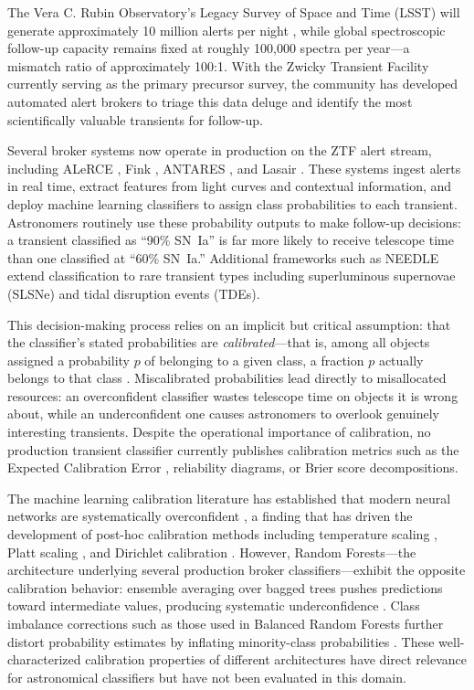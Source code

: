 \documentclass[twocolumn]{aastex631}
\begin{document}
The Vera C. Rubin Observatory's Legacy Survey of Space and Time (LSST) will generate approximately 10 million alerts per night \citep{ivezic2019}, while global spectroscopic follow-up capacity remains fixed at roughly 100,000 spectra per year---a mismatch ratio of approximately 100:1. With the Zwicky Transient Facility \citep[ZTF;][]{bellm2019} currently serving as the primary precursor survey, the community has developed automated alert brokers to triage this data deluge and identify the most scientifically valuable transients for follow-up.

Several broker systems now operate in production on the ZTF alert stream, including ALeRCE \citep{forster2021}, Fink \citep{moller2021}, ANTARES \citep{narayan2018}, and Lasair \citep{smith2019}. These systems ingest alerts in real time, extract features from light curves and contextual information, and deploy machine learning classifiers to assign class probabilities to each transient. Astronomers routinely use these probability outputs to make follow-up decisions: a transient classified as ``90\% SN~Ia'' is far more likely to receive telescope time than one classified at ``60\% SN~Ia.'' Additional frameworks such as NEEDLE \citep{sheng2024} extend classification to rare transient types including superluminous supernovae (SLSNe) and tidal disruption events (TDEs).

This decision-making process relies on an implicit but critical assumption: that the classifier's stated probabilities are \emph{calibrated}---that is, among all objects assigned a probability $p$ of belonging to a given class, a fraction $p$ actually belongs to that class \citep{dawid1982}. Miscalibrated probabilities lead directly to misallocated resources: an overconfident classifier wastes telescope time on objects it is wrong about, while an underconfident one causes astronomers to overlook genuinely interesting transients. Despite the operational importance of calibration, no production transient classifier currently publishes calibration metrics such as the Expected Calibration Error \citep[ECE;][]{naeini2015}, reliability diagrams, or Brier score decompositions.

The machine learning calibration literature has established that modern neural networks are systematically overconfident \citep{guo2017}, a finding that has driven the development of post-hoc calibration methods including temperature scaling \citep{guo2017}, Platt scaling \citep{platt1999}, and Dirichlet calibration \citep{kull2019}. However, Random Forests---the architecture underlying several production broker classifiers---exhibit the opposite calibration behavior: ensemble averaging over bagged trees pushes predictions toward intermediate values, producing systematic underconfidence \citep{niculescumizil2005, bostrom2008}. Class imbalance corrections such as those used in Balanced Random Forests further distort probability estimates by inflating minority-class probabilities \citep{vandengoorbergh2022}. These well-characterized calibration properties of different architectures have direct relevance for astronomical classifiers but have not been evaluated in this domain.
\end{document}
